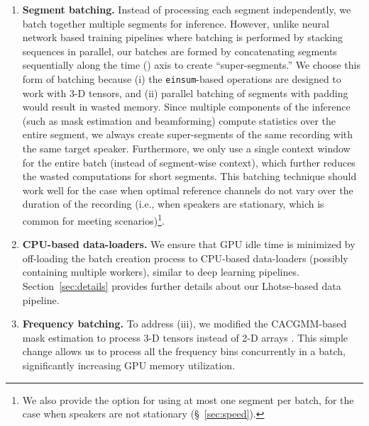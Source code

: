 \documentclass[a4paper]{article}
\begin{document}
\begin{enumerate}[wide, labelwidth=!, labelindent=0pt]
\item \textbf{Segment batching.} Instead of processing each segment independently, we batch together multiple segments for inference. However, unlike neural network based training pipelines where batching is performed by stacking sequences in parallel, our batches are formed by concatenating segments sequentially along the time () axis to create ``super-segments.'' We choose this form of batching because (i) the \texttt{einsum}-based operations are designed to work with 3-D tensors, and (ii) parallel batching of segments with padding would result in wasted memory. Since multiple components of the inference (such as mask estimation and beamforming) compute statistics over the entire segment, we always create super-segments of the same recording with the same target speaker. Furthermore, we only use a single context window for the entire batch (instead of segment-wise context), which further reduces the wasted computations for short segments. This batching technique should work well for the case when optimal reference channels do not vary over the duration of the recording (i.e., when speakers are stationary, which is common for meeting scenarios)\footnote{We also provide the option for using at most one segment per batch, for the case when speakers are not stationary (\S~\ref{sec:speed}).}.

\item \textbf{CPU-based data-loaders.} We ensure that GPU idle time is minimized by off-loading the batch creation process to CPU-based data-loaders (possibly containing multiple workers), similar to deep learning pipelines. Section~\ref{sec:details} provides further details about our Lhotse-based data pipeline.

\item \textbf{Frequency batching.} To address (iii), we modified the CACGMM-based mask estimation to process 3-D tensors  instead of 2-D arrays . This simple change allows us to process all the frequency bins concurrently in a batch, significantly increasing GPU memory utilization.


\end{enumerate}
\end{document}
